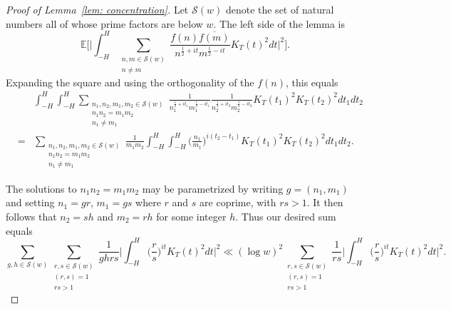 \documentclass[12pt, notitlepage]{amsart}
\numberwithin{equation}{section}
\def\E{\mathbb E}
\def\ssum{\sideset{_{} ^{}} {_{} ^{\dagger}}{\sum }}
\theoremstyle{remark}
\theoremstyle{definition}
\theoremstyle{remark}
\numberwithin{equation}{section}
\begin{document}
\begin{proof}[Proof of Lemma~\ref{lem: concentration}]  Let ${\mathcal S}(w)$ denote the set of natural numbers all of whose prime factors are below $w$.   The left side of the lemma is 
$$ 
\E\Big[\Big|\int_{-H}^{H} \sum_{\substack{n,m \in {\mathcal S}(w) \\ n \neq m}} \frac{f(n) \overline{f(m)}}{n^{\frac 12+it} m^{\frac 12 - it}} K_T(t)^{2}dt \Big|^{2}\Big].
 $$
Expanding the square and using the orthogonality of the $f(n)$, this equals 
\begin{eqnarray*}
& &\int_{-H}^{H}\int_{-H}^{H} \sum_{\substack{n_1, n_2, m_1, m_2 \in {\mathcal S}(w) \\ n_1 n_2 = m_1 m_2 \\ n_1 \neq m_1}} \frac{1}{n_1^{\frac 12+it_1} m_1^{\frac 12 - it_1}} \frac{1}{n_2^{\frac 12+it_2} m_2^{\frac 12 - it_2}} K_T(t_1)^{2} K_T(t_2)^{2} dt_1 dt_2 \\
& = &  \sum_{\substack{n_1, n_2, m_1, m_2 \in {\mathcal S}(w) \\ n_1 n_2 = m_1 m_2 \\ n_1 \neq m_1}}  \frac{1}{m_1m_2} \int_{-H}^{H}\int_{-H}^{H} \Big(\frac{n_1}{m_1}\Big)^{i(t_2-t_1)} K_T(t_1)^{2} K_T(t_2)^{2} dt_1 dt_2 . 
\end{eqnarray*}

The solutions to $n_1n_2= m_1m_2$ may be parametrized by writing $g=(n_1,m_1)$ and setting $n_1= gr$, $m_1= gs$ where $r$ and $s$ are coprime, with $rs>1$.   It then follows that $n_2= sh$ and $m_2= rh$ for some integer $h$.  Thus our desired sum equals 
\begin{equation} 
\label{3.1} 
\sum_{g, h \in{\mathcal S}(w)} \sum_{\substack{ r, s\in {\mathcal S}(w) \\ (r,s)=1 \\ rs >1}} \frac{1}{ghrs} \Big|\int_{-H}^{H} \Big(\frac rs\Big)^{it} K_T(t)^2 dt \Big|^2 \ll 
(\log w)^2  \sum_{\substack{ r, s\in {\mathcal S}(w) \\ (r,s)=1 \\ rs >1}} \frac{1}{rs} \Big|\int_{-H}^{H} \Big(\frac rs\Big)^{it} K_T(t)^2 dt \Big|^2. 
\end{equation} 



\end{proof}
\end{document}
